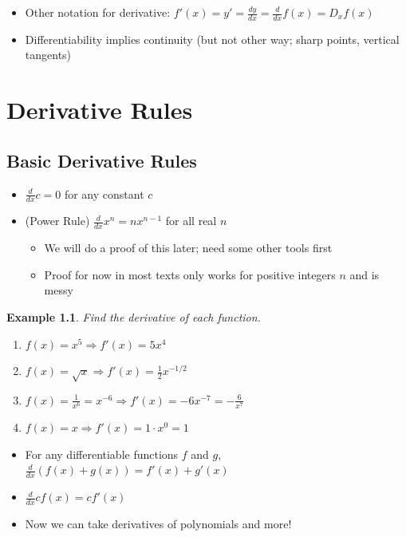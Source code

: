 \documentclass[letterpaper, 11pt, openany]{book}
\theoremstyle{mytheoremstyle}
\theoremstyle{myexamplestyle}
\newtheorem{example}{Example}[section]
\begin{document}
\begin{itemize}
    \item Other notation for derivative: \(f'(x) = y' = \frac{dy}{dx} = \frac{d}{dx}f(x) = D_{x} f(x) \)
    \item Differentiability implies continuity (but not other way; sharp points, vertical tangents)
\end{itemize}
\newpage\thispagestyle{firstofchapter}
\chapter{Derivative Rules}
\section{Basic Derivative Rules}
\begin{itemize}
    \item \( \frac{d}{dx} c = 0\) for any constant \(c\)
    \item (Power Rule) \(\frac{d}{dx} x^{n} = n x^{n-1}\) for all real \(n\)
    \begin{itemize}
        \item We will do a proof of this later; need some other tools first
        \item Proof for now in most texts only works for positive integers \(n\) and is messy
    \end{itemize}
\end{itemize}
\begin{example}\label{e:power-rule-basic}
    Find the derivative of each function.
    \begin{enumerate}
        \item \(f(x) = x^{5} \Rightarrow f'(x) = 5x^{4}\)
        \item \(f(x) = \sqrt{x} \Rightarrow f'(x) = \frac{1}{2}x^{-1/2}\)
        \item \(f(x) = \frac{1}{x^{6}} = x^{-6} \Rightarrow f'(x) = -6x^{-7} = -\frac{6}{x^{7}}\)
        \item \(f(x) = x  \Rightarrow f'(x) = 1\cdot x^{0} = 1\)
    \end{enumerate}
\end{example}
\begin{itemize}
    \item For any differentiable functions \(f\) and \(g\), \(\frac{d}{dx}\left(f(x) + g(x)\right) = f'(x) + g'(x)\)
    \item \(\frac{d}{dx} c f(x) = cf'(x)\)
    \item Now we can take derivatives of polynomials and more!
\end{itemize}
\end{document}
